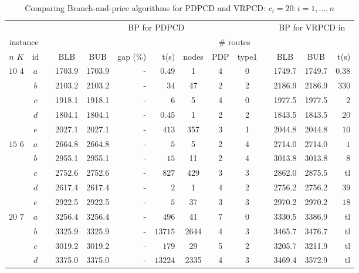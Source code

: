 \begin{table}[!htb]
\footnotesize
\caption{Comparing Branch-and-price algorithms for PDPCD and VRPCD: $c_i = 20:i = 1,\dots,n$}
\begin{tabular}{cccccrrccccccr}
\multicolumn{2}{c}{} & & \multicolumn{7}{c}{BP for PDPCD} & &
\multicolumn{3}{c}{BP for VRPCD in \cite{inoc11}} \\
\cline{4-10} \cline{12-14}
 \multicolumn{2}{c}{instance} & & & & & & & \multicolumn{2}{c}{\# routes} & & & & \\
 \cline{1-2} \cline{9-10}
$n$ \hspace{4mm} $K$ & id & & BLB & BUB & gap (\%) & t(s) & nodes & PDP & type1 &
& BLB & BUB & t(s) \\
\hline
\multirow{5}{*}{$10$ \hspace{5mm} $4$}
& $a$ & & 1703.9 & 1703.9 & - & $0.49$ & 1 & 4 & 0 & & 1749.7 & 1749.7 & $0.38$ \\
& $b$ & & 2103.2 & 2103.2 & - & $34$ & 47 & 2 & 2 & & 2186.9 & 2186.9 & $330$ \\
& $c$ & & 1918.1 & 1918.1 & - & $6$ & 5 & 4 & 0 & & 1977.5 & 1977.5 & $2$ \\
& $d$ & & 1804.1 & 1804.1 & - & $0.45$ & 1 & 2 & 2 & & 1843.5 & 1843.5 & $20$ \\
& $e$ & & 2027.1 & 2027.1 & - & $413$ & 357 & 3 & 1 & & 2044.8 & 2044.8 & $10$ \\
\hline
\multirow{5}{*}{$15$  \hspace{5mm} $6$}
& $a$ & & 2664.8 & 2664.8 & - & $5$ & 5 & 2 & 4 & & 2714.0 & 2714.0 & $1$ \\
& $b$ & & 2955.1 & 2955.1 & - & $15$ & 11 & 2 & 4 & & 3013.8 & 3013.8 & $8$ \\
& $c$ & & 2752.6 & 2752.6 & - & $827$ & 429 & 3 & 3 & & 2862.0 & 2875.5 & tl \\
& $d$ & & 2617.4 & 2617.4 & - & $2$ & 1 & 4 & 2 & & 2756.2 & 2756.2 & $39$ \\
& $e$ & & 2922.5 & 2922.5 & - & $5$ & 37 & 3 & 3 & & 2970.2 & 2970.2 & $18$ \\
\hline
\multirow{5}{*}{$20$  \hspace{5mm} $7$}
& $a$ & & 3256.4 & 3256.4 & - & $496$ & 41 & 7 & 0 & & 3330.5 & 3386.9 & tl \\
& $b$ & & 3325.9 & 3325.9 & - & $13715$ & 2644 & 4 & 3 & & 3465.7 & 3476.7 & tl \\
& $c$ & & 3019.2 & 3019.2 & - & $179$ & 29 & 5 & 2 & & 3205.7 & 3211.9 & tl \\
& $d$ & & 3375.0 & 3375.0 & - & $13224$ & 2335 & 4 & 3 & & 3469.4 & 3572.9 & tl \\

\end{tabular}
\end{table}
